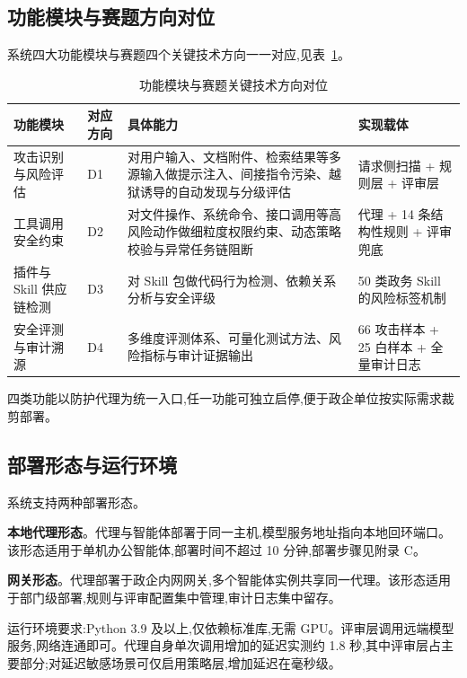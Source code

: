 \subsection{功能模块与赛题方向对位}

系统四大功能模块与赛题四个关键技术方向一一对应,见表~\ref{tab:module-mapping}。

\begin{table}[H]
  \centering
  \caption{功能模块与赛题关键技术方向对位}
  \label{tab:module-mapping}
  \small
  \begin{tabular}{p{2.6cm} p{1.2cm} p{5.6cm} p{4.2cm}}
    \toprule
    功能模块 & 对应方向 & 具体能力 & 实现载体 \\
    \midrule
    攻击识别与风险评估 & D1 & 对用户输入、文档附件、检索结果等多源输入做提示注入、间接指令污染、越狱诱导的自动发现与分级评估 & 请求侧扫描 + 规则层 + 评审层 \\
    工具调用安全约束 & D2 & 对文件操作、系统命令、接口调用等高风险动作做细粒度权限约束、动态策略校验与异常任务链阻断 & 代理 + 14 条结构性规则 + 评审兜底 \\
    插件与 Skill 供应链检测 & D3 & 对 Skill 包做代码行为检测、依赖关系分析与安全评级 & 50 类政务 Skill 的风险标签机制 \\
    安全评测与审计溯源 & D4 & 多维度评测体系、可量化测试方法、风险指标与审计证据输出 & 66 攻击样本 + 25 白样本 + 全量审计日志 \\
    \bottomrule
  \end{tabular}
\end{table}

四类功能以防护代理为统一入口,任一功能可独立启停,便于政企单位按实际需求裁剪部署。

\subsection{部署形态与运行环境}

系统支持两种部署形态。

\textbf{本地代理形态}。代理与智能体部署于同一主机,模型服务地址指向本地回环端口。该形态适用于单机办公智能体,部署时间不超过 10 分钟,部署步骤见附录 C。

\textbf{网关形态}。代理部署于政企内网网关,多个智能体实例共享同一代理。该形态适用于部门级部署,规则与评审配置集中管理,审计日志集中留存。

运行环境要求:Python 3.9 及以上,仅依赖标准库,无需 GPU。评审层调用远端模型服务,网络连通即可。代理自身单次调用增加的延迟实测约 1.8 秒,其中评审层占主要部分;对延迟敏感场景可仅启用策略层,增加延迟在毫秒级。
